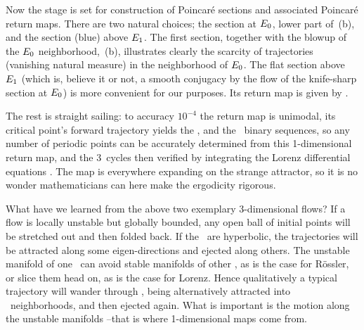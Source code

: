 Now the stage is set for construction of  Poincar\'e sections
and associated  Poincar\'e return maps. There are two natural
choices; the section at $E_{0}$, lower part of
\,(b), and the section (blue) above
$E_{1}$. The first section, together with the blowup of
the $E_{0}$ neighborhood, \,(b),
illustrates clearly the scarcity of trajectories (vanishing
natural measure) in the neighborhood of $E_{0}$. The flat
section above $E_{1}$ (which is, believe it or not, a
smooth conjugacy by the flow of the knife-sharp section at
$E_{0}$) is more convenient for our purposes. Its return
map is given by .

The rest is straight sailing: to accuracy $10^{-4}$ the return
map is unimodal, its critical point's forward trajectory
yields the \ks, and the \admissible\ binary
sequences, so any number of periodic points  can be accurately
determined from this 1-dimensional return map, and the 3\dmn\
cycles then verified by integrating the Lorenz differential
equations . The map is everywhere expanding on
the strange attractor, so it is no wonder mathematicians can
here make the ergodicity rigorous.

What have we learned from the above two exemplary 3-dimensional
flows? If a flow is locally unstable but globally bounded, any
open ball of initial points will be stretched out and then
folded back. If the \eqva\ are hyperbolic, the trajectories
will be attracted along some eigen-directions and ejected along
others. The unstable manifold of one \eqv\ can avoid stable
manifolds of other \eqva, as is the case for R\"ossler, or
slice them head on, as is the case for Lorenz. Hence
qualitatively a typical trajectory will wander through
\statesp, being alternatively attracted into \eqva\
neighborhoods, and then ejected again. What is important is the
motion along the unstable manifolds --that is where
1-dimensional maps come from.
